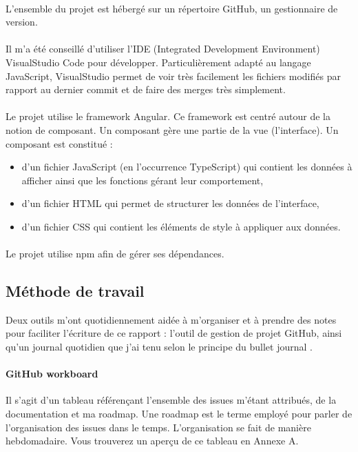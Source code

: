\documentclass[12pt]{article}
\begin{document}
\paragraph{}
L'ensemble du projet est hébergé sur un répertoire GitHub, un gestionnaire de version.

\paragraph{}
Il m'a été conseillé d'utiliser l'IDE (Integrated Development Environment) VisualStudio Code pour développer. Particulièrement adapté au langage JavaScript, VisualStudio permet de voir très facilement les fichiers modifiés par rapport au dernier commit et de faire des merges très simplement.

\paragraph{}
Le projet utilise le framework Angular. Ce framework est centré autour de la notion de composant. Un composant gère une partie de la vue (l'interface). Un composant est constitué :
\begin{itemize}
    \item d'un fichier JavaScript (en l'occurrence TypeScript) qui contient les données à afficher ainsi que les fonctions gérant leur comportement,
    \item d'un fichier HTML qui permet de structurer les données de l'interface,
    \item d'un fichier CSS qui contient les éléments de style à appliquer aux données.
\end{itemize}

\paragraph{}
Le projet utilise npm \cite{npm} afin de gérer ses dépendances.\\

\subsection{Méthode de travail}
Deux outils m'ont quotidiennement aidée à m'organiser et à prendre des notes pour faciliter l'écriture de ce rapport : l'outil de gestion de projet GitHub, ainsi qu'un journal quotidien que j'ai tenu selon le principe du bullet journal \cite{bullet}.

\paragraph{GitHub workboard}
Il s'agit d'un tableau référençant l'ensemble des issues m'étant attribués, de la documentation et ma roadmap. Une roadmap est le terme employé pour parler de l'organisation des issues dans le temps. L'organisation se fait de manière hebdomadaire. Vous trouverez un aperçu de ce tableau en Annexe A.
\end{document}
